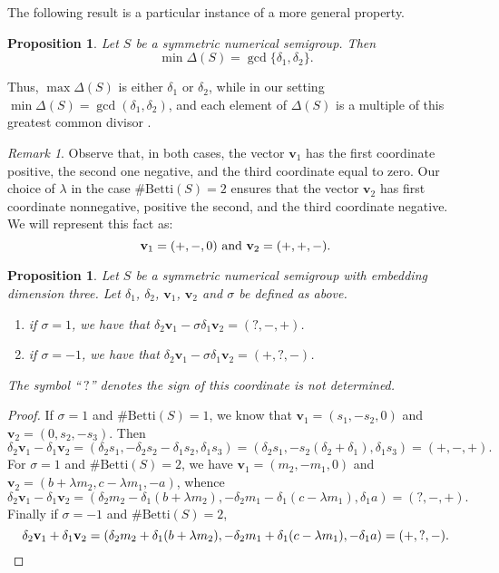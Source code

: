 \documentclass[11pt]{amsart}
\newtheorem{proposition}[theorem]{Proposition}
\theoremstyle{remark}
\newtheorem{remark}[theorem]{Remark}
\begin{document}
The following result is a particular instance of a more general property. 

\begin{proposition}\label{min-delta}\cite[Corollay 3.1]{CGLMS}
	Let $S$ be a symmetric numerical semigroup. Then \[\min\Delta(S)=\gcd\{\delta_1,\delta_2\}.\] 
\end{proposition}

Thus, $\max \Delta(S)$ is either $\delta_1$ or $\delta_2$, while in our setting $\min \Delta(S)=\gcd(\delta_1,\delta_2)$, and each element of $\Delta(S)$ is a multiple of this greatest common divisor \cite{G}. %

\begin{remark}
Observe that, in both cases, the vector $\mathbf v_1$ has the first coordinate positive, the second one negative, and the third coordinate equal to zero. Our choice of $\lambda$ in the case $\#\mathrm{Betti}(S)=2$ ensures that the vector $\mathbf v_2$ has first coordinate nonnegative, positive the second, and the third coordinate negative. We will represent this fact as: 
\[\mathbf v_1=(+,-,0) \hbox{ and }\mathbf v_2=(+,+,-).\]
\end{remark}


\begin{proposition}\label{signos-v-deltas}
Let $S$ be a symmetric numerical semigroup with embedding dimension three. Let $\delta_1$, $\delta_2$, $\mathbf v_1$, $\mathbf v_2$ and $\sigma$ be defined as above. 
\begin{enumerate}[(1)]
\item if $\sigma=1$, we have that $\delta_2\mathbf v_1-\sigma\delta_1\mathbf v_2=(?,-,+)$.

\item if $\sigma=-1$, we have that $\delta_2\mathbf v_1-\sigma\delta_1\mathbf v_2=(+,?,-)$.
\end{enumerate}
The symbol ``$\ ?$'' denotes the sign of this coordinate is not determined.
\end{proposition}
\begin{proof}
If $\sigma=1$ and $\#\mathrm{Betti}(S)=1$, we know that $\mathbf v_1=(s_1,-s_2,0)$ and $\mathbf v_2=(0,s_2,-s_3)$. Then
\[
\delta_2\mathbf v_1-\delta_1\mathbf v_2=( \delta_2s_1,-\delta_2s_2-\delta_1s_2,\delta_1s_3)=(\delta_2s_1,-s_2(\delta_2+\delta_1),\delta_1s_3)=(+,-,+).
\]
For $\sigma=1$ and $\#\mathrm{Betti}(S)=2$, we have $\mathbf v_1=(m_2,-m_1,0)$ and $\mathbf v_2=(b+\lambda m_2,c-\lambda m_1,-a)$, whence
\[
\delta_2\mathbf v_1-\delta_1\mathbf v_2=( \delta_2m_2-\delta_1(b+\lambda m_2),-\delta_2m_1-\delta_1(c-\lambda m_1),\delta_1a)=(?,-,+).
\]
Finally if $\sigma=-1$ and $\#\mathrm{Betti}(S)=2$, 
\[
\delta_2\mathbf v_1+\delta_1\mathbf v_2=( \delta_2m_2+\delta_1(b+\lambda m_2),-\delta_2m_1+\delta_1(c-\lambda m_1),-\delta_1a)=(+,?,-).\qedhere
\]
\end{proof}
\end{document}
